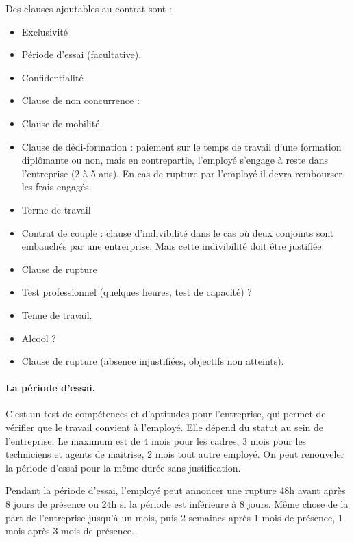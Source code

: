 	Des clauses ajoutables au contrat sont :
	\begin{itemize}
		\item[\textbullet] Exclusivité
		\item[\textbullet] Période d’essai (facultative).
		\item[\textbullet] Confidentialité
		\item[\textbullet] Clause de non concurrence : 
		\item[\textbullet] Clause de mobilité.
		\item[\textbullet] Clause de dédi-formation : paiement sur le temps de travail d’une formation diplômante ou non, mais en contrepartie, l’employé s’engage à reste dans l’entreprise (2 à 5 ans). En cas de rupture par l'employé il devra rembourser les frais engagés.
		\item[\textbullet] Terme de travail
		\item[\textbullet] Contrat de couple : clause d'indivibilité dans le cas où deux conjoints sont embauchés par une entrerprise. Mais cette indivibilité doit être justifiée.
		\item[\textbullet] Clause de rupture
		\item[\textbullet] Test professionnel (quelques heures, test de capacité) ?
		\item[\textbullet] Tenue de travail.
		\item[\textbullet] Alcool ?
		\item[\textbullet] Clause de rupture (absence injustifiées, objectifs non atteints).
	\end{itemize}
	
	\paragraph{La période d'essai.}
	C'est un test de compétences et d'aptitudes pour l'entreprise, qui permet de vérifier que le travail convient à l'employé.
	Elle dépend du statut au sein de l’entreprise. 
	Le maximum est de 4 mois pour les cadres, 3 mois pour les techniciens et agents de maitrise, 2 mois tout autre employé.
	On peut renouveler la période d’essai pour la même durée sans justification.
	
	Pendant la période d’essai, l’employé peut annoncer une rupture 48h avant après 8 jours de présence ou 24h si la période est inférieure à 8 jours.
	Même chose de la part de l'entreprise jusqu'à un mois, puis 2 semaines après 1 mois de présence, 1 mois après 3 mois de présence.
	

